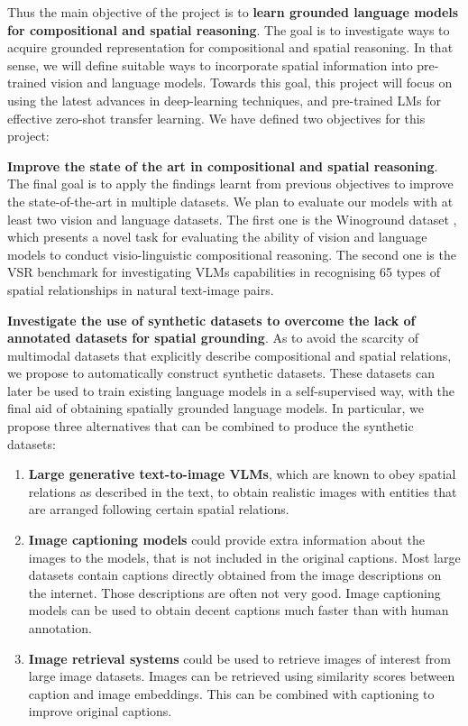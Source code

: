 Thus the main objective of the project is to \textbf{learn grounded language models for compositional and spatial reasoning}. The goal is to investigate ways to acquire grounded representation for compositional and spatial reasoning. In that sense, we will define suitable ways to incorporate spatial information into pre-trained vision and language models. Towards this goal, this project will focus on using the latest advances in deep-learning techniques, and pre-trained LMs for effective zero-shot transfer learning. We have defined two objectives for this project:

\textbf{Improve the state of the art in compositional and spatial reasoning}. The final goal is to apply the findings learnt from previous objectives to improve the state-of-the-art in multiple datasets. We plan to evaluate our models with at least two vision and language datasets. The first one is the Winoground dataset \cite{thrush2022winoground}, which presents a novel task for evaluating the ability of vision and language models to conduct visio-linguistic compositional reasoning. The second one is the VSR benchmark \cite{liu2022visual} for investigating VLMs capabilities in recognising 65 types of spatial relationships in natural text-image pairs.

\textbf{Investigate the use of synthetic datasets to overcome the lack of annotated datasets for spatial grounding}. As to avoid the scarcity of multimodal datasets that explicitly describe compositional and spatial relations, we propose to automatically construct synthetic datasets. These datasets can later be used to train existing language models in a self-supervised way, with the final aid of obtaining spatially grounded language models. In particular, we propose three alternatives that can be combined to produce the synthetic datasets:
\begin{enumerate}
    \item \textbf{Large generative text-to-image VLMs}, which are known to obey spatial relations as described in the text, to obtain realistic images with entities that are arranged following certain spatial relations.
    \item \textbf{Image captioning models} could provide extra information about the images to the models, that is not included in the original captions. Most large datasets contain captions directly obtained from the image descriptions on the internet. Those descriptions are often not very good. Image captioning models can be used to obtain decent captions much faster than with human annotation.
    \item \textbf{Image retrieval systems} could be used to retrieve images of interest from large image datasets. Images can be retrieved using similarity scores between caption and image embeddings. This can be combined with captioning to improve original captions.
\end{enumerate}

